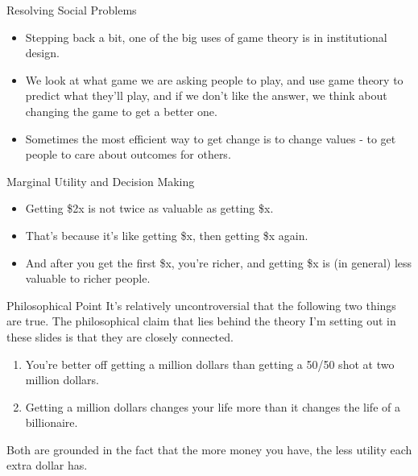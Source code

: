 \documentclass[
  ignorenonframetext,
]{beamer}
\providecommand{\tightlist}{%
  \setlength{\itemsep}{0pt}\setlength{\parskip}{0pt}}
\begin{document}
\begin{frame}{Resolving Social Problems}
\protect\hypertarget{resolving-social-problems}{}
\begin{itemize}
\tightlist
\item
  Stepping back a bit, one of the big uses of game theory is in
  institutional design.
\item
  We look at what game we are asking people to play, and use game theory
  to predict what they'll play, and if we don't like the answer, we
  think about changing the game to get a better one.
\item
  Sometimes the most efficient way to get change is to change values -
  to get people to care about outcomes for others.
\end{itemize}
\end{frame}

\begin{frame}{Marginal Utility and Decision Making}
\protect\hypertarget{marginal-utility-and-decision-making}{}
\begin{itemize}
\tightlist
\item
  Getting \$2x is not twice as valuable as getting \$x.
\item
  That's because it's like getting \$x, then getting \$x again.
\item
  And after you get the first \$x, you're richer, and getting \$x is (in
  general) less valuable to richer people.
\end{itemize}
\end{frame}

\begin{frame}{Philosophical Point}
\protect\hypertarget{philosophical-point}{}
It's relatively uncontroversial that the following two things are true.
The philosophical claim that lies behind the theory I'm setting out in
these slides is that they are closely connected.

\begin{enumerate}
\tightlist
\item
  You're better off getting a million dollars than getting a 50/50 shot
  at two million dollars.
\item
  Getting a million dollars changes your life more than it changes the
  life of a billionaire.
\end{enumerate}

Both are grounded in the fact that the more money you have, the less
utility each extra dollar has.
\end{frame}
\end{document}
